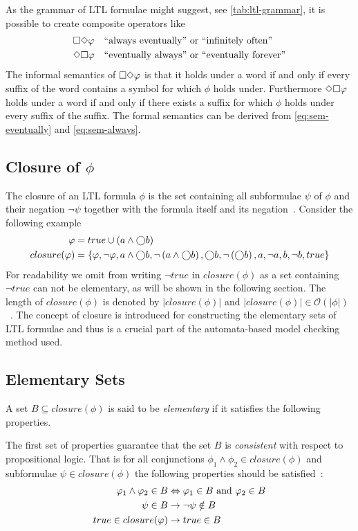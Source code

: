 As the grammar of LTL formulae might suggest, see \autoref{tab:ltl-grammar}, it is possible to create composite operators like
\begin{align*}
    &\square\Diamond\varphi \quad \text{``always eventually'' or ``infinitely often''}\\
    &\Diamond\square\varphi \quad \text{``eventually always'' or ``eventually forever''}
\end{align*}
The informal semantics of $\square\Diamond\varphi$ is that it holds under a word if and only if every suffix of the word contains a symbol for which $\phi$ holds under. Furthermore $\Diamond\square\varphi$ holds under a word if and only if there exists a suffix for which $\phi$ holds under every suffix of the suffix. The formal semantics can be derived from \autoref{eq:sem-eventually} and \autoref{eq:sem-always}.

\subsection{Closure of $\phi$}
The closure of an LTL formula $\phi$ is the set containing all subformulae $\psi$ of $\phi$ and their negation $\lnot \psi$ together with the formula itself and its negation~\cite[Def.~5.34]{baier2008principles}. Consider the following example
\begin{align*}
    \varphi &= true \cup \left( a \land \bigcirc b \right) \\
    closure(\varphi) &= \left\{ \varphi, \lnot \varphi, a \land \bigcirc b, \lnot \left( a \land \bigcirc b \right), \bigcirc b, \lnot \left( \bigcirc b \right), a, \lnot a, b, \lnot b, true \right\}
\end{align*}
For readability we omit from writing $\lnot true$ in $closure(\phi)$ as a set containing $\lnot true$ can not be elementary, as will be shown in the following section. The length of $closure(\phi)$ is denoted by $|closure(\phi)|$ and $|closure(\phi)| \in \mathcal{O}\left(|\phi|\right)$~\cite{baier2008principles}. The concept of closure is introduced for constructing the elementary sets of LTL formulae and thus is a crucial part of the automata-based model checking method used.

\subsection{Elementary Sets}\label{sec:elemesets}
A set $B \subseteq closure(\phi)$ is said to be \emph{elementary} if it satisfies the following properties.

The first set of properties guarantee that the set $B$ is \emph{consistent} with respect to propositional logic. That is for all conjunctions $\phi_1 \land \phi_2 \in closure(\phi)$ and subformulae $\psi \in closure(\phi)$ the following properties should be satisfied~\cite[Fig.~5.20]{baier2008principles}:
\begin{align}
    \varphi_1 \land \varphi_2 \in B &\Leftrightarrow \varphi_1 \in B \text{ and } \varphi_2 \in B \label{eq:elem1.1} \\
    \psi \in B &\rightarrow \lnot \psi \notin B \label{eq:elem1.2} \\
    true \in closure(\varphi) &\rightarrow true \in B \label{eq:elem1.3}
\end{align}

